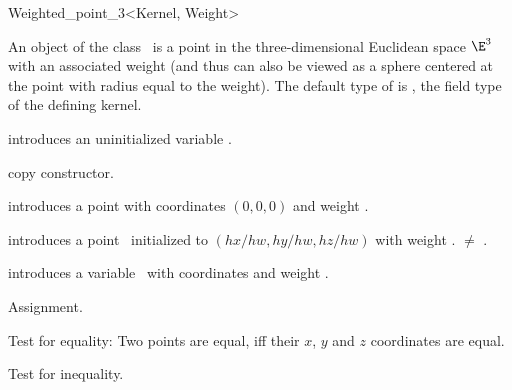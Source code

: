 \begin{ccRefClass} {Weighted_point_3<Kernel, Weight>}

\ccDefinition
An object of the class \ccRefName\ is a point in the three-dimensional
Euclidean space $\E^3$ with an associated weight (and thus can also be 
viewed as a sphere centered at the point with radius equal to the weight). 
The default type of  is , the
field type of the defining kernel.

\ccInheritsFrom
{}

\ccTypes


\ccCreation
{}


\ccHidden {}
             {introduces an uninitialized variable \ccVar.}

\ccHidden {}
            {copy constructor.}

            {introduces a point with  
             coordinates $(0,0,0)$ and weight .}

            {introduces a point \ccVar\ initialized to $(hx/hw,hy/hw, hz/hw)$
             with weight .
             \ccPrecond {} $\neq$ .}

            {introduces a variable \ccVar\ with 
             coordinates  and weight .}

\ccOperations

\ccHidden {}
        {Assignment.}

       {Test for equality: Two points are equal, iff their $x$, $y$ and $z$
        coordinates are equal.}

       {Test for inequality.}


\end{ccRefClass}
